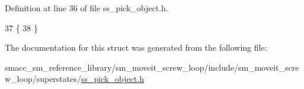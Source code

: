 Definition at line 36 of file ss\+\_\+pick\+\_\+object.\+h.


\begin{DoxyCode}
37             \{
38             \}
\end{DoxyCode}


The documentation for this struct was generated from the following file\+:\begin{DoxyCompactItemize}
\item 
smacc\+\_\+sm\+\_\+reference\+\_\+library/sm\+\_\+moveit\+\_\+screw\+\_\+loop/include/sm\+\_\+moveit\+\_\+screw\+\_\+loop/superstates/\hyperlink{sm__moveit__screw__loop_2include_2sm__moveit__screw__loop_2superstates_2ss__pick__object_8h}{ss\+\_\+pick\+\_\+object.\+h}\end{DoxyCompactItemize}
